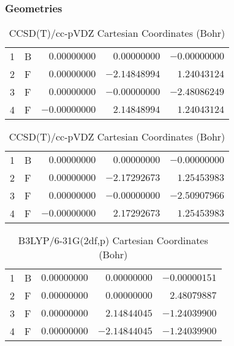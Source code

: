 \documentclass[10pt,oneside]{article}
\begin{document}
\clearpage

\subsection{}

\begin{table}[h!]
\subsubsection*{Geometries}
\begin{multicols}{2}
\centering
\caption{CCSD(T)/cc-pVTZ Cartesian Coordinates (Bohr)}
\begin{tabular}{llrrr}
\toprule
1  & B  & $ 0.00000000$ & $ 0.00000000$ & $-0.00000000$ \\
2  & F  & $ 0.00000000$ & $-2.14848994$ & $ 1.24043124$ \\
3  & F  & $ 0.00000000$ & $-0.00000000$ & $-2.48086249$ \\
4  & F  & $-0.00000000$ & $ 2.14848994$ & $ 1.24043124$ \\
\bottomrule
\end{tabular}
\caption{CCSD(T)/cc-pVDZ Cartesian Coordinates (Bohr)}
\begin{tabular}{llrrr}
\toprule
1  & B  & $ 0.00000000$ & $ 0.00000000$ & $-0.00000000$ \\
2  & F  & $ 0.00000000$ & $-2.17292673$ & $ 1.25453983$ \\
3  & F  & $ 0.00000000$ & $-0.00000000$ & $-2.50907966$ \\
4  & F  & $-0.00000000$ & $ 2.17292673$ & $ 1.25453983$ \\
\bottomrule
\end{tabular}
\end{multicols}
\end{table}

\begin{table}[h]
\centering
\caption{B3LYP/6-31G(2df,p) Cartesian Coordinates (Bohr)}
\begin{tabular}{llrrr}
\toprule
1  & B  & $ 0.00000000$ & $ 0.00000000$ & $-0.00000151$ \\
2  & F  & $ 0.00000000$ & $ 0.00000000$ & $ 2.48079887$ \\
3  & F  & $ 0.00000000$ & $ 2.14844045$ & $-1.24039900$ \\
4  & F  & $ 0.00000000$ & $-2.14844045$ & $-1.24039900$ \\
\bottomrule
\end{tabular}
\end{table}
\end{document}
